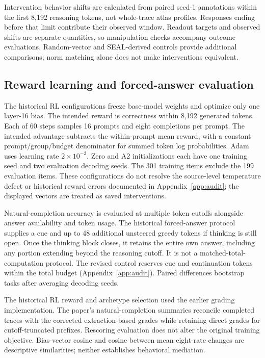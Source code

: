 Intervention behavior shifts are calculated from paired seed-1 annotations within the first 8,192 reasoning tokens, not whole-trace atlas profiles. Responses ending before that limit contribute their observed window. Readout targets and observed shifts are separate quantities, so manipulation checks accompany outcome evaluations. Random-vector and SEAL-derived controls provide additional comparisons; norm matching alone does not make interventions equivalent.

\subsection{Reward learning and forced-answer evaluation}
The historical RL configurations freeze base-model weights and optimize only one layer-16 bias. The intended reward is correctness within 8,192 generated tokens. Each of 60 steps samples 16 prompts and eight completions per prompt. The intended advantage subtracts the within-prompt mean reward, with a constant prompt/group/budget denominator for summed token log probabilities. Adam uses learning rate $2\times10^{-3}$. Zero and A2 initializations each have one training seed and two evaluation decoding seeds. The 301 training items exclude the 199 evaluation items. These configurations do not resolve the source-level temperature defect or historical reward errors documented in Appendix~\ref{app:audit}; the displayed vectors are treated as saved interventions.

Natural-completion accuracy is evaluated at multiple token cutoffs alongside answer availability and token usage. The historical forced-answer protocol supplies a cue and up to 48 additional unsteered greedy tokens if thinking is still open. Once the thinking block closes, it retains the entire own answer, including any portion extending beyond the reasoning cutoff. It is not a matched-total-computation protocol. The revised control reserves cue and continuation tokens within the total budget (Appendix~\ref{app:audit}). Paired differences bootstrap tasks after averaging decoding seeds.

The historical RL reward and archetype selection used the earlier grading implementation. The paper's natural-completion summaries reconcile completed traces with the corrected extraction-based grades while retaining direct grades for cutoff-truncated prefixes. Rescoring evaluation does not alter the original training objective. Bias-vector cosine and cosine between mean eight-rate changes are descriptive similarities; neither establishes behavioral mediation.

